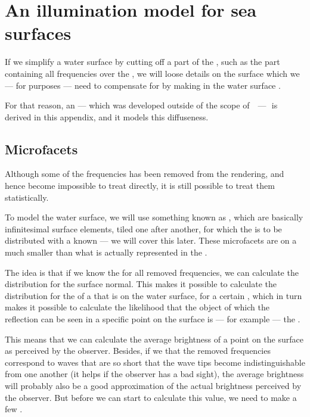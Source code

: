 \chapter{An illumination model for sea surfaces}
\label{chap:illumination_model_derivation}

If we simplify a water surface by cutting off a part of the , such as the part containing all frequencies over the , we will loose details on the surface which we --- for \visualization purposes --- need to compensate for by making  in the water surface .

For that reason, an  --- which was developed outside of the scope of \thismasterthesiswork\ \,---\ \,is derived in this appendix, and it models this diffuseness.

\section{Microfacets}

Although some of the frequencies has been removed from the rendering, and hence become impossible to treat directly, it is still possible to treat them statistically.

To model the water surface, we will use something known as \microfacets, which are basically infinitesimal surface elements, tiled one after another, for which the  is \assumed to be \stochastically distributed with a known  --- we will cover this later. These microfacets are on a much smaller \scale than what is actually represented in the \rendering.

The idea is that if we know the  for all removed frequencies, we can calculate the distribution for the surface normal. This makes it possible to calculate the distribution for the  of a \ray that is  on the water surface, for a certain , which in turn makes it possible to calculate the likelihood that the object of which the reflection can be seen in a specific point on the surface is --- for example --- the \sun.

This means that we can calculate the average brightness of a point on the surface as perceived by the observer. Besides, if we \assume that the removed frequencies correspond to waves that are so short that the wave tips become indistinguishable from one another (it helps if the observer has a bad sight), the average brightness will probably also be a good approximation of the actual brightness perceived by the observer. But before we can start to calculate this value, we need to make a few \assumptions.

